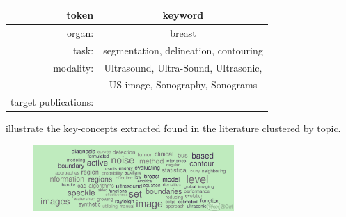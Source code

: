 \begin{table}[!ht]
\begin{adjustwidth}{-2.25in}{0in} %
\caption{
{\bf {}}}
    \begin{tabular}{r|c}
      token & keyword\\
      \hline
      organ: & breast \\
      task: & segmentation, delineation, contouring \\
      modality: & Ultrasound, Ultra-Sound, Ultrasonic, \\
      & US image, Sonography, Sonograms \\
      target publications: & %
    \end{tabular}
    \begin{flushleft} 
\end{flushleft}
\label{table1}
\end{adjustwidth}
\end{table}

 illustrate the key-concepts extracted found in the literature clustered by topic. 

\begin{figure}
    \centering
    \includegraphics[width=3.0in]{wcloud}
    \caption{}%
    \label{fig:wcloud}
\end{figure}


